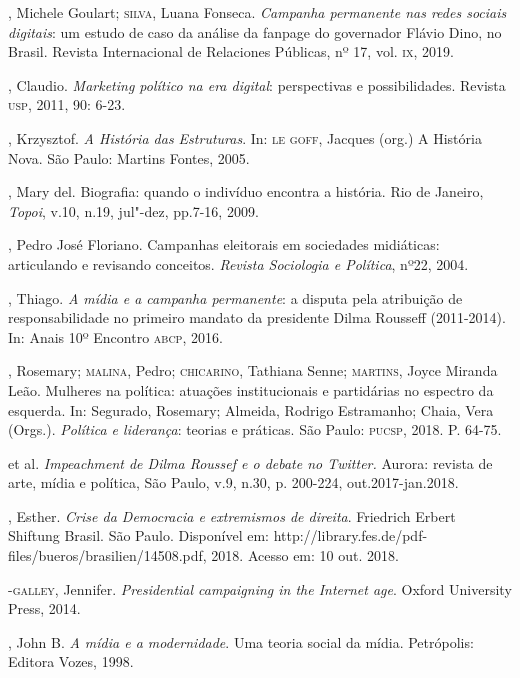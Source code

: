 \begin{bibliohedra}
, Michele Goulart; \textsc{silva}, Luana Fonseca. \emph{Campanha
permanente nas redes sociais digitais}: um estudo de caso da análise da
fanpage do governador Flávio Dino, no Brasil. Revista Internacional de
Relaciones Públicas, nº 17, vol. \textsc{ix}, 2019.

, Claudio. \emph{Marketing político na era digital}:
perspectivas e possibilidades. Revista \textsc{usp}, 2011, 90: 6-23.

, Krzysztof. \emph{A História das Estruturas}. In: \textsc{le} \textsc{goff},
Jacques (org.) A História Nova. São Paulo: Martins Fontes, 2005.

, Mary del. Biografia: quando o indivíduo encontra a história. Rio
de Janeiro, \emph{Topoi}, v.10, n.19, jul"-dez, pp.7-16, 2009.

, Pedro José Floriano. Campanhas eleitorais em sociedades
midiáticas: articulando e revisando conceitos. \emph{Revista
Sociologia e Política}, nº22, 2004.

, Thiago. \emph{A mídia e a campanha permanente}: a disputa
pela atribuição de responsabilidade no primeiro mandato da presidente
Dilma Rousseff (2011-2014). In: Anais 10º Encontro \textsc{abcp}, 2016.

, Rosemary; \textsc{malina}, Pedro; \textsc{chicarino}, Tathiana Senne; \textsc{martins},
Joyce Miranda Leão. Mulheres na política: atuações institucionais e
partidárias no espectro da esquerda. In: Segurado, Rosemary; Almeida,
Rodrigo Estramanho; Chaia, Vera (Orgs.). \emph{Política e liderança}:
teorias e práticas. São Paulo: \textsc{pucsp}, 2018. P. 64-75.

\titidem\mbox{} et al. \emph{Impeachment de Dilma Roussef e o
debate no Twitter.} Aurora: revista de arte, mídia e política, São
Paulo, v.9, n.30, p. 200-224, out.2017-jan.2018.

, Esther. \emph{Crise da Democracia e extremismos de direita}.
Friedrich Erbert Shiftung Brasil. São Paulo. Disponível em:
http://library.fes.de/pdf-files/bueros/brasilien/14508.pdf, 2018. Acesso
em: 10 out. 2018.

-\textsc{galley}, Jennifer. \emph{Presidential campaigning in the
Internet age}. Oxford University Press, 2014.

, John B. \emph{A mídia e a modernidade}. Uma teoria social da
mídia. Petrópolis: Editora Vozes, 1998.
\end{bibliohedra}

